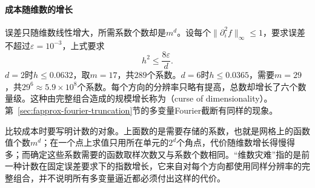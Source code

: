 \paragraph{成本随维数的增长}
误差只随维数线性增大，所需系数个数却是$m^d$。设每个$\lVert\partial_i^2f\rVert_\infty\leq1$，要求误差不超过$\varepsilon=10^{-3}$，上式要求
\[
 h^2\leq\frac{8\varepsilon}d .
\]
$d=2$时$h\leq0.0632$，取$m=17$，共$289$个系数。$d=6$时$h\leq0.0365$，需要$m=29$，共$29^6\approx5.9\times10^8$个系数。每个方向的分辨率只略有提高，总数却增长了六个数量级。这种由完整组合造成的规模增长称为（curse of dimensionality）。第~\ref{sec:fapprox-fourier-truncation}节的多变量Fourier截断有同样的现象。

比较成本时要写明计数的对象。上面数的是需要存储的系数，也就是网格上的函数值个数$m^d$；在一个点上求值只用所在单元的$2^d$个角点，代价随维数增长得慢得多；而确定这些系数需要的函数取样次数又与系数个数相同。“维数灾难”指的是前一种计数在固定误差要求下的指数增长，它来自对每个方向都使用同样分辨率的完整组合，并不说明所有多变量逼近都必须付出这样的代价。
